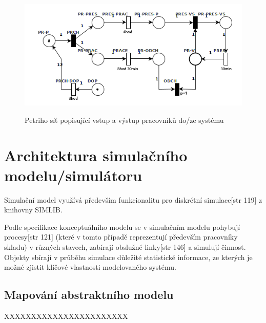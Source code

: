 \documentclass[11pt]{article}
\begin{document}
	\begin{figure}[h!]
		\caption{Petriho síť popisující vstup a výstup pracovníků do/ze systému}
		\centering
		\includegraphics[width=\textwidth]{images/petri_net_prichody.png}
		\label{obr:petriho-sit-vstupvystup}
	\end{figure}
	
	
%	
	
	\newpage
	\section{Architektura simulačního modelu/simulátoru}
	Simulační model využívá především funkcionalitu pro diskrétní simulace[str 119] z knihovny SIMLIB\cite{simlib}.
	
	Podle specifikace konceptuálního modelu se v simulačním modelu pohybují procesy[str 121] (které v tomto případě reprezentují především pracovníky skladu) v různých stavech, zabírají obslužné linky[str 146] a simulují činnost.
	Objekty sbírají v průběhu simulace důležité statistické informace, ze kterých je možné zjistit klíčové vlastnosti modelovaného systému.
	
	\subsection{Mapování abstraktního modelu}
	XXXXXXXXXXXXXXXXXXXXXXX
	
\end{document}
